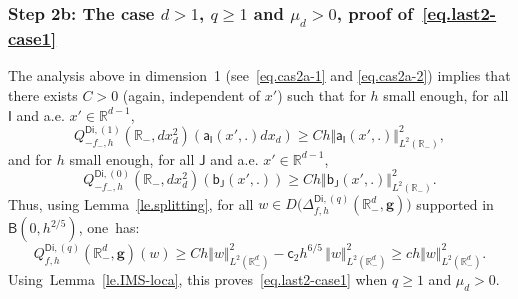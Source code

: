 \documentclass[10pt]{amsart}
\newcommand{\mbf}[1]{\mathbf{#1}}
\theoremstyle{plain}
\theoremstyle{definition}
\begin{document}
\subsubsection*{Step 2b: The case $d>1$, $q \ge 1$ and $\mu_{d}>0$, proof of~\eqref{eq.last2-case1}}
The analysis above in dimension~1 (see~\eqref{eq.cas2a-1} and
\eqref{eq.cas2a-2}) implies that there exists $C>0$ (again,
independent of $x'$) such that for $h$ small enough, for all $\mathsf I$ and a.e. $x'\in \mathbb R^{d-1}$,
\[
Q^{\mathsf{Di},(1)}_{-f_-,h}(\mathbb R_-,dx_d^2) (\mathsf a_{\mathsf I}(x',.)dx_d) \ge Ch \Vert \mathsf a_{\mathsf I}(x',.) \Vert_{L^2(\mathbb R_-)}^2,
\]
and for $h$ small enough, for all $\mathsf J$ and a.e. $x'\in \mathbb R^{d-1}$,
\[
Q^{\mathsf{Di},(0)}_{-f_-,h}(\mathbb R_-,dx_d^2) (\mathsf b_{\mathsf J}(x',.)) \ge Ch \Vert \mathsf b_{\mathsf J}(x',.) \Vert_{L^2(\mathbb R_-)}^2.
\]
Thus, using Lemma~\ref{le.splitting}, for all $w\in D\bigl(\Delta_{f,h}^{\mathsf{Di},(q)}(\mathbb R_-^d, \mbf g) \bigr)$ supported in $\mathsf B(0,h^{2/5 })$, one~has:
\[
Q^{\mathsf{Di},(q)}_{f,h}(\mathbb R_-^d, \mbf g)(w)\ge Ch \Vert w \Vert_{L^2(\mathbb R^d_-)}^2-\mathsf c_2h^{6/5}\, \Vert w \Vert_{L^2(\mathbb R^d_-)}^2\ge ch \Vert w \Vert_{L^2(\mathbb R^d_-)}^2.
\]
Using~Lemma~\ref{le.IMS-loca}, this proves~\eqref{eq.last2-case1} when $q\ge 1$ and $\mu_{d}>0$.
\end{document}
